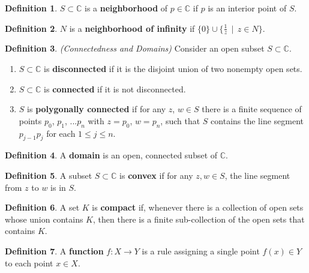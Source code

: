\documentclass[a4paper]{article}
\theoremstyle{definition}
\newtheorem{definition}{Definition}
\begin{document}
	\begin{definition}
		$S \subset \mathbb{C}$ is a \textbf{neighborhood} of $p \in \mathbb{C}$ if $p$ is an interior point of $S$.
	\end{definition}
	
	\begin{definition}
		$N$ is a \textbf{neighborhood of infinity} if $\{0\} \cup \{\frac{1}{z} \; \, | \; \, z \in N \}$.
	\end{definition}
	
	\begin{definition}
		\emph{(Connectedness and Domains)}
		Consider an open subset $S \subset \mathbb{C}$.
		\begin{enumerate}[label=\alph*.]
			\item $S \subset \mathbb{C}$ is \textbf{disconnected} if it is the disjoint union of two nonempty open sets.
			\item $S \subset \mathbb{C}$ is \textbf{connected} if it is not disconnected.
			\item $S$ is \textbf{polygonally connected} if for any $z$, $w \in S$ there is a finite sequence of points $p_{0}$, $p_{1}$, $... p_{n}$ with $z = p_{0}$, $w = p_{n}$, such that $S$ contains the line segment $p_{j-1}p_{j}$ for each $1 \leq j \leq n$.
		\end{enumerate}
	\end{definition}
	
	\begin{definition}
		A \textbf{domain} is an open, connected subset of $\mathbb{C}$.
	\end{definition}
	
	\begin{definition}
		A subset $S \subset \mathbb{C}$ is \textbf{convex} if for any $z, w \in S$, the line segment from $z$ to $w$ is in $S$.
	\end{definition}
	
	\begin{definition}
		A set $K$ is \textbf{compact} if, whenever there is a collection of open sets whose union contains $K$, then there is a finite sub-collection of the open sets that contains $K$.
	\end{definition}
	
	\begin{definition}
		A \textbf{function} $f : X \rightarrow Y$ is a rule assigning a single point $f(x) \in Y$ to each point $x \in X$.
	\end{definition}
	
\end{document}
